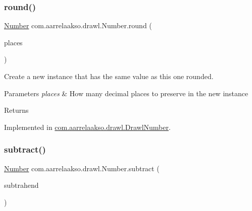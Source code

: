 \mbox{\label{interfacecom_1_1aarrelaakso_1_1drawl_1_1_number_a0d76b3c8e56e9f18a3ce9baf42be705f}} 
\subsubsection{\texorpdfstring{round()}{round()}\hspace{0.1cm}{\footnotesize\ttfamily [2/2]}}
{\footnotesize\ttfamily \hyperlink{interfacecom_1_1aarrelaakso_1_1drawl_1_1_number}{Number} com.\+aarrelaakso.\+drawl.\+Number.\+round (\begin{DoxyParamCaption}\item[{final int}]{places }\end{DoxyParamCaption})}



Create a new instance that has the same value as this one rounded. 


\begin{DoxyParams}{Parameters}
{\em places} & How many decimal places to preserve in the new instance \\
\hline
\end{DoxyParams}
\begin{DoxyReturn}{Returns}

\end{DoxyReturn}


Implemented in \hyperlink{classcom_1_1aarrelaakso_1_1drawl_1_1_drawl_number_a9755cb62f7e9df1377379aa6781b8de0}{com.\+aarrelaakso.\+drawl.\+Drawl\+Number}.

\mbox{\label{interfacecom_1_1aarrelaakso_1_1drawl_1_1_number_ac28e81198ea485a48568a9a543cb5293}} 
\subsubsection{\texorpdfstring{subtract()}{subtract()}\hspace{0.1cm}{\footnotesize\ttfamily [1/3]}}
{\footnotesize\ttfamily \hyperlink{interfacecom_1_1aarrelaakso_1_1drawl_1_1_number}{Number} com.\+aarrelaakso.\+drawl.\+Number.\+subtract (\begin{DoxyParamCaption}\item[{@Not\+Null final \hyperlink{interfacecom_1_1aarrelaakso_1_1drawl_1_1_number}{Number}}]{subtrahend }\end{DoxyParamCaption})}



